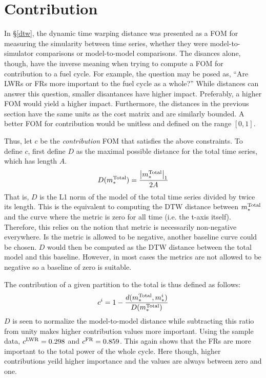 \clearpage
\section{Contribution}
\label{contribution}

In \S\ref{dtw}, the dynamic time warping distance was presented as a 
FOM for measuring the simularity between time series, whether they 
were model-to-simulator comparisons or model-to-model comparisons.
The disances alone, though, have the inverse meaning when trying to 
compute a FOM for contribution to a fuel cycle.  For example, the 
question may be posed as, ``Are LWRs or FRs more important to the fuel 
cycle as a whole?'' While distances can answer this question, smaller 
disantances have higher impact. Preferably, a higher FOM would yield a 
higher impact. Furthermore, the distances in the previous section have
the same units as the cost matrix and are similarly bounded. A better 
FOM for contribution would be unitless and defined on the range $[0,1]$.

Thus, let $c$ be the \emph{contribution} FOM that satisfies the above 
constraints. To define $c$, first define $D$ as the maximal possible 
distance for the total time series, which has length $A$.
\begin{equation}
\label{D-def}
D(m_*^{\mathrm{Total}}) = \frac{\left|m_*^{\mathrm{Total}}\right|_1}{2A}
\end{equation}
That is, $D$ is the L1 norm of the model of the total time series divided
by twice its length. This is the equivalent to computing the DTW distance
between $m_*^{\mathrm{Total}}$ and the curve where the metric is zero for all time 
(i.e. the t-axis itself).  Therefore, this relies on the notion that 
metric is necessarily non-negative everywhere.  Is the metric is allowed to 
be negative, another baseline curve could be chosen. $D$ would then be 
computed as the DTW distance between the total model and this baseline.
However, in most cases the metrics are not allowed to be negative so 
a baseline of zero is suitable.

The contribution of a given partition to the total is thus defined as follows:
\begin{equation}
\label{cont}
c^i = 1 - \frac{d(m_*^{\mathrm{Total}}, m_*^i)}{D(m_*^{\mathrm{Total}})}
\end{equation}
$D$ is seen to normalize the model-to-model distance while subtracting this
ratio from unity makes higher contribution values more important.  
Using the sample data, $c^{\mathrm{LWR}} = 0.298$ and $c^{\mathrm{FR}} = 0.859$. This again shows
that the FRs are more important to the total power of the whole cycle.
Here though, higher contributions yeild higher importance and the values
are always between zero and one.

